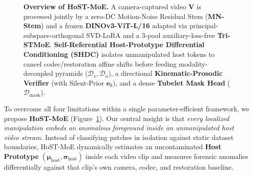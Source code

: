 \documentclass[10pt,twocolumn]{article}
\begin{document}
\begin{figure}[t]
{%
}
\vspace{-4pt}
\caption{\textbf{Overview of HoST-MoE.} A camera-captured video $\mathbf{V}$ is processed jointly by a zero-DC Motion-Noise Residual Stem (\textbf{MN-Stem}) and a frozen \textbf{DINOv3-ViT-L/16} adapted via principal-subspace-orthogonal SVD-LoRA and a 3-pool auxiliary-loss-free \textbf{Tri-STMoE}. \textbf{Self-Referential Host-Prototype Differential Conditioning (SHDC)} isolates unmanipulated host tokens to cancel codec/restoration affine shifts before feeding modality-decoupled pyramids ($\mathcal{D}_v, \mathcal{D}_a$), a directional \textbf{Kinematic-Prosodic Verifier} (with Silent-Prior $\mathbf{e}_\emptyset$), and a dense \textbf{Tubelet Mask Head} ($\mathcal{D}_{\text{mask}}$).}
\label{fig:arch}
\vspace{-4pt}
\end{figure}

To overcome all four limitations within a single parameter-efficient framework, we propose \textbf{HoST-MoE} (Figure~\ref{fig:arch}). Our central insight is that \emph{every localized manipulation embeds an anomalous foreground inside an unmanipulated host video stream}. Instead of classifying patches in isolation against static dataset boundaries, HoST-MoE dynamically estimates an uncontaminated \textbf{Host Prototype} $(\boldsymbol{\mu}_{\text{host}}, \boldsymbol{\sigma}_{\text{host}})$ inside each video clip and measures forensic anomalies differentially against that clip's own camera, codec, and restoration baseline.
\end{document}

